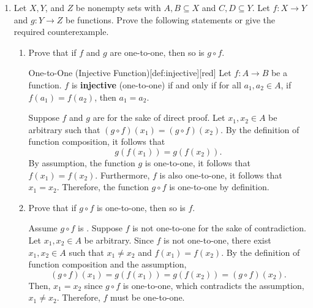 \newpage













\begin{enumerate} 
  \item Let $X, Y$, and $Z$ be nonempty sets with $A, B \subseteq X$ and $C, D \subseteq Y$. 
  Let $f: X \rightarrow Y$ and $g: Y \rightarrow Z$ be functions. 
  Prove the following statements or give the required counterexample.
  \begin{enumerate}
    \item Prove that if $f$ and $g$ are one-to-one, then so is $g \circ f$.
    \begin{define}{One-to-One (Injective Function)}[def:injective][red]
      Let $f : A \to B$ be a function. $f$ is \textbf{injective} (one-to-one) if and only if for all $a_1, a_2 \in A$, if $f(a_1) = f(a_2)$, then $a_1 = a_2$.
    \end{define}
    \begin{subprove}
      Suppose $f$ and $g$ are  for the sake of direct proof.\proofstep
      Let $x_1, x_2 \in A$ be arbitrary such that $(g \circ f)(x_1) = (g \circ f)(x_2)$.
      By the definition of function composition, it follows that $$g(f(x_1)) = g(f(x_2)).$$
      By assumption, the function $g$ is one-to-one, it follows that $f(x_1) = f(x_2)$.
      Furthermore, $f$ is also one-to-one, it follows that $x_1 = x_2$.\proofstep
      Therefore, the function $g \circ f$ is one-to-one by definition.
    \end{subprove}
    \item Prove that if $g \circ f$ is one-to-one, then so is $f$.
    \begin{subprove}
      Assume $g \circ f$ is . Suppose $f$ is not one-to-one 
      for the sake of contradiction. \proofstep
      Let $x_1, x_2 \in A$ be arbitrary. Since $f$ is not one-to-one, 
      there exist $x_1, x_2 \in A$ such that $x_1 \neq x_2$ and $f(x_1) = f(x_2)$. 
      By the definition of function composition and the assumption, $$(g \circ f)(x_1) = g(f(x_1)) = g(f(x_2)) = (g \circ f)(x_2).$$
      Then, $x_1 = x_2$ since $g \circ f$ is one-to-one, which contradicts the assumption, $x_1 \neq x_2$. Therefore, $f$ must be one-to-one.

\end{subprove}
\end{enumerate}
\end{enumerate}
